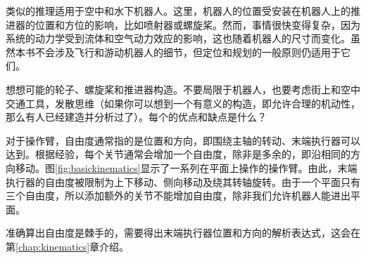 类似的推理适用于空中和水下机器人。这里，机器人的位置受安装在机器人上的推进器的位置和方位的影响，比如喷射器或螺旋桨。然而，事情很快变得复杂，因为系统的动力学受到流体和空气动力效应的影响，这也随着机器人的尺寸而变化。虽然本书不会涉及飞行和游动机器人的细节，但定位和规划的一般原则仍适用于它们。

\begin{framed}
想想可能的轮子、螺旋桨和推进器构造。不要局限于机器人，也要考虑街上和空中交通工具，发散思维（如果你可以想到一个有意义的构造，即允许合理的机动性，那么有人已经建造并分析过了）。每个的优点和缺点是什么？
\end{framed}



对于操作臂，自由度通常指的是位置和方向，即围绕主轴的转动、末端执行器可以达到。根据经验，每个关节通常会增加一个自由度，除非是多余的，即沿相同的方向移动。图\ref{fig:basickinematics}显示了一系列在平面上操作的操作臂。由此，末端执行器的自由度被限制为上下移动、侧向移动及绕其转轴旋转。由于一个平面只有三个自由度，所以添加额外的关节不能增加自由度，除非我们允许机器人能进出平面。

准确算出自由度是棘手的，需要得出末端执行器位置和方向的解析表达式，这会在第\ref{chap:kinematics}章介绍。

